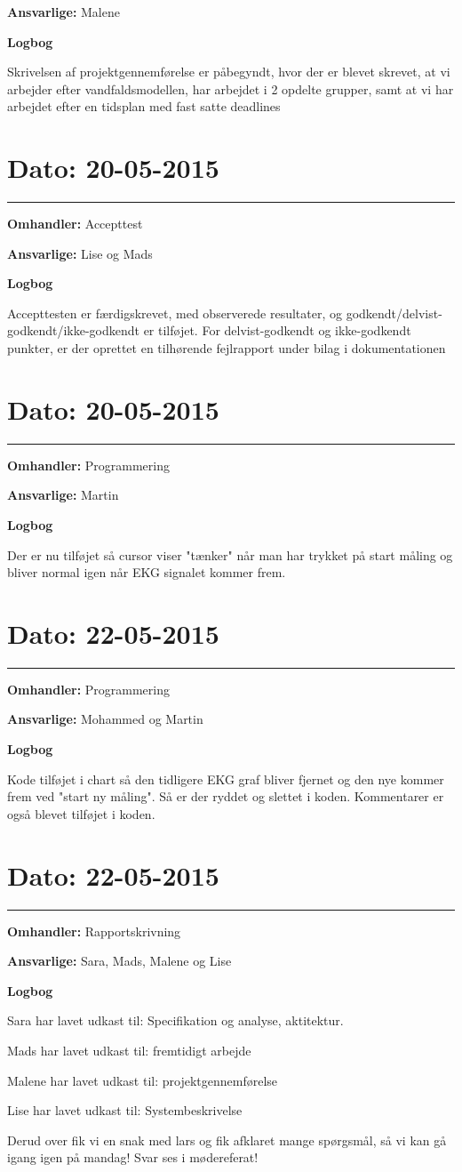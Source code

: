 \textbf{Ansvarlige:} Malene

\textbf{Logbog}

Skrivelsen af projektgennemførelse er påbegyndt, hvor der er blevet skrevet, at vi arbejder efter vandfaldsmodellen, har arbejdet i 2 opdelte grupper, samt at vi har arbejdet efter en tidsplan med fast satte deadlines

\section{Dato: 20-05-2015}
\hrule
\textbf{Omhandler:} Accepttest

\textbf{Ansvarlige:} Lise og Mads

\textbf{Logbog}

Accepttesten er færdigskrevet, med observerede resultater, og godkendt/delvist-godkendt/ikke-godkendt er tilføjet.
For delvist-godkendt og ikke-godkendt punkter, er der oprettet en tilhørende fejlrapport under bilag i dokumentationen


\section{Dato: 20-05-2015}
\hrule
\textbf{Omhandler:} Programmering

\textbf{Ansvarlige:} Martin

\textbf{Logbog}

Der er nu tilføjet så cursor viser "tænker" når man har trykket på start måling og bliver normal igen når EKG signalet kommer frem.



\section{Dato: 22-05-2015}
\hrule
\textbf{Omhandler:} Programmering

\textbf{Ansvarlige:} Mohammed og Martin

\textbf{Logbog}

Kode tilføjet i chart så den tidligere EKG graf bliver fjernet og den nye kommer frem ved "start ny måling". Så er der ryddet og slettet i koden. Kommentarer er også blevet tilføjet i koden.

\section{Dato: 22-05-2015}
\hrule

\textbf{Omhandler:} Rapportskrivning

\textbf{Ansvarlige:} Sara, Mads, Malene og Lise

\textbf{Logbog}

Sara har lavet udkast til: Specifikation og analyse, aktitektur. 

Mads har lavet udkast til: fremtidigt arbejde 

Malene har lavet udkast til: projektgennemførelse 

Lise har lavet udkast til: Systembeskrivelse 

Derud over fik vi en snak med lars og fik afklaret mange spørgsmål, så vi kan gå igang igen på mandag! Svar ses i mødereferat!  





 